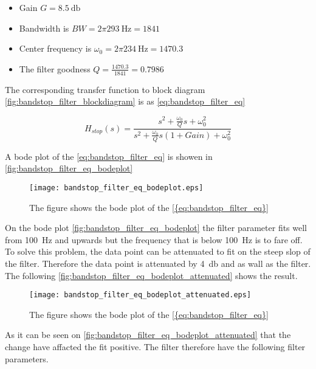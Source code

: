 \begin{itemize}
\item Gain $G = \SI{8.5}{\decibel}$
\item Bandwidth is $BW = 2\pi \SI{293}{\hertz} = 1841$
\item Center frequency is $\omega_0 = 2\pi \SI{234}{\hertz} = 1470.3$
\item The filter goodness $Q = \frac{1470.3}{1841} = 0.7986$
\end{itemize}

The corresponding transfer function to block diagram \autoref{fig:bandstop_filter_blockdiagram} is as \autoref{eq:bandstop_filter_eq}

\begin{equation}\label{eq:bandstop_filter_eq}
H_{stop}(s) = \frac{s^2+\frac{\omega_0}{Q}s+\omega_0^2}{s^2+\frac{\omega_0}{Q}s(1+Gain)+\omega_0^2}
\end{equation}

A bode plot of the \autoref{eq:bandstop_filter_eq} is showen in \autoref{fig:bandstop_filter_eq_bodeplot}



\begin{figure}[H]
	\centering
	\texttt{[image: bandstop\_filter\_eq\_bodeplot.eps]}
	\caption{The figure shows the bode plot of the \autoref{{eq:bandstop_filter_eq}}}
		\label{fig:bandstop_filter_eq_bodeplot}
\end{figure}

On the bode plot  \autoref{fig:bandstop_filter_eq_bodeplot} the filter parameter fits well from \SI{100}{\hertz} and upwards but the frequency that is below \SI{100}{\hertz} is to fare off. To solve this problem, the data point can be attenuated to fit on the steep slop of the filter. Therefore the data point is attenuated by \SI{4}{\decibel} and as wall as the filter. The following \autoref{fig:bandstop_filter_eq_bodeplot_attenuated} shows the result.

\begin{figure}[H]
	\centering
	\texttt{[image: bandstop\_filter\_eq\_bodeplot\_attenuated.eps]}
	\caption{The figure shows the bode plot of the \autoref{{eq:bandstop_filter_eq}}}
		\label{fig:bandstop_filter_eq_bodeplot_attenuated}
\end{figure}


As it can be seen on \autoref{fig:bandstop_filter_eq_bodeplot_attenuated} that the change have affacted the fit positive. The filter therefore have the following filter parameters.



